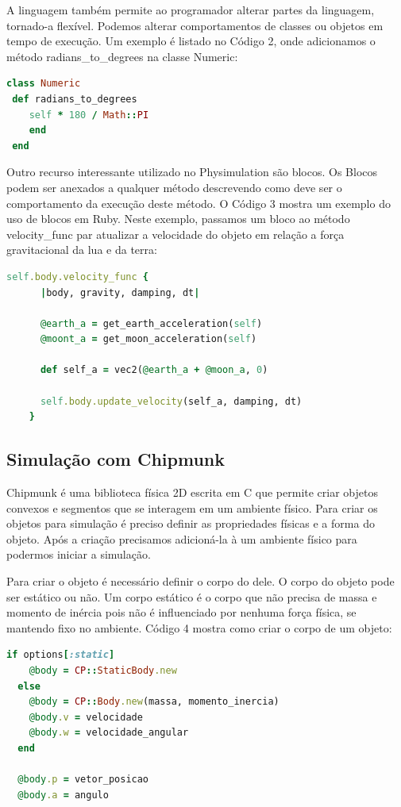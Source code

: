 A linguagem também permite ao programador alterar partes da linguagem, tornado-a flexível. Podemos alterar comportamentos de classes ou objetos 
em tempo de execução. Um exemplo é listado no Código 2, onde adicionamos o método radians\_to\_degrees na classe Numeric: 

\begin{lstlisting}[language=Ruby, caption=physics.rb ]
class Numeric
 def radians_to_degrees
    self * 180 / Math::PI
    end
 end
\end{lstlisting}

Outro recurso interessante utilizado no Physimulation são blocos. Os Blocos podem ser anexados a qualquer método descrevendo como deve ser 
o comportamento da execução deste método. O Código 3 mostra um exemplo do uso de blocos em Ruby. Neste exemplo, passamos um bloco ao método velocity\_func 
par atualizar a velocidade do objeto em relação a força gravitacional da lua e da terra: 

\begin{lstlisting}[language=Ruby, caption=RocketSimulation.rb]
    self.body.velocity_func { 
      |body, gravity, damping, dt|

      @earth_a = get_earth_acceleration(self)
      @moont_a = get_moon_acceleration(self)

      def self_a = vec2(@earth_a + @moon_a, 0)

      self.body.update_velocity(self_a, damping, dt)
    }
\end{lstlisting}

\subsection{Simulação com Chipmunk}
Chipmunk é uma biblioteca física 2D escrita em C que permite criar objetos convexos e segmentos que se interagem em um ambiente físico. Para criar os 
objetos para simulação é preciso definir as propriedades físicas e a forma do objeto. Após a criação precisamos adicioná-la à um ambiente físico para podermos 
iniciar a simulação.

Para criar o objeto é necessário definir o corpo do dele. O corpo do objeto pode ser estático ou não. Um corpo estático é o corpo que não precisa de
massa e momento de inércia pois não é influenciado por nenhuma força física, se mantendo fixo no ambiente. Código 4 mostra como criar o corpo de um objeto:

\begin{lstlisting}[language=Ruby, caption=physics.rb]
  if options[:static]
    @body = CP::StaticBody.new
  else
    @body = CP::Body.new(massa, momento_inercia)
    @body.v = velocidade
    @body.w = velocidade_angular
  end

  @body.p = vetor_posicao
  @body.a = angulo
\end{lstlisting} 

